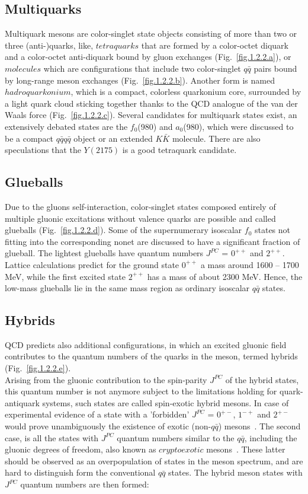 \subsection{Multiquarks}
Multiquark mesons are color-singlet state objects consisting of more than two or three (anti-)quarks, like, $tetraquarks$ that are formed by a color-octet diquark and a color-octet anti-diquark bound by gluon exchanges (Fig.~\ref{fig.1.2.2.a}), or $molecules$ which are configurations that include two color-singlet $q\bar{q}$ pairs bound by long-range meson exchanges (Fig.~\ref{fig.1.2.2.b}). Another form is named $hadroquarkonium$, which is a compact, colorless quarkonium core, surrounded by a light quark cloud sticking together thanks to the QCD analogue of the van der Waals force (Fig.~\ref{fig.1.2.2.c}). Several candidates for multiquark states exist, an extensively debated states are the $f_0$(980) and $a_0$(980), which were discussed to be a compact $q\bar{q}$$q\bar{q}$ object or an extended $K\bar{K}$ molecule. There are also speculations that the $Y(2175)$ is a good tetraquark candidate.

\subsection{Glueballs}
Due to the gluons self-interaction, color-singlet states composed entirely of multiple gluonic excitations without valence quarks are possible and called glueballs (Fig.~\ref{fig.1.2.2.d}). Some of the supernumerary isoscalar $f_0$ states not fitting into the corresponding nonet are discussed to have a significant fraction of glueball. The lightest glueballs have quantum numbers $J^{PC}$ = $0^{++}$ and $2^{++}$. Lattice calculations predict for the ground state $0^{++}$ a mass around 1600 – 1700 MeV, while the first excited state $2^{++}$ has a mass of about 2300 MeV. Hence, the low-mass glueballs lie in the same mass region as ordinary isoscalar $q\bar{q}$ states.

\subsection{Hybrids}
QCD predicts also additional configurations, in which an excited gluonic field contributes to the quantum numbers of the quarks in the meson, termed hybrids (Fig.~\ref{fig.1.2.2.e}).\\
Arising from the gluonic contribution to the spin-parity $J^{PC}$ of the hybrid states, this quantum number is not anymore subject to the limitations holding for quark-antiquark systems, such states are called spin-exotic hybrid mesons. In case of experimental evidence of a state with a 'forbidden' $J^{PC}$ = $0^{+-}$, $1^{-+}$ and $2^{+-}$ would prove unambiguously the existence of exotic (non-$q\bar{q}$) mesons~\cite{Isgur85}. The second case, is all the states with $J^{PC}$ quantum numbers similar to the $q\bar{q}$, including the gluonic degrees of freedom, also known as $cryptoexotic$ mesons~\cite{Meyer18}. These latter should be observed as an overpopulation of states in the meson spectrum, and are hard to distinguish form the conventional $q\bar{q}$ states. The hybrid meson states with $J^{PC}$ quantum numbers are then formed:

